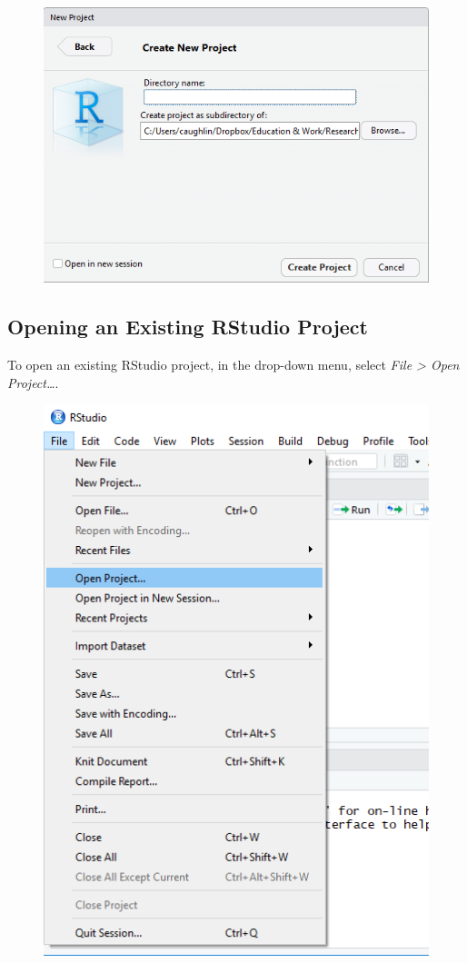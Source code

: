 \documentclass[]{book}
\begin{document}
\begin{figure}
\centering
\includegraphics{Create New Project.png}
\caption{}
\end{figure}

\subsection{Opening an Existing RStudio
Project}\label{opening-an-existing-rstudio-project}

To open an existing RStudio project, in the drop-down menu, select
\emph{File \textgreater{} Open Project\ldots{}}.

\begin{figure}
\centering
\includegraphics{Open Project.png}
\caption{}
\end{figure}
\end{document}
